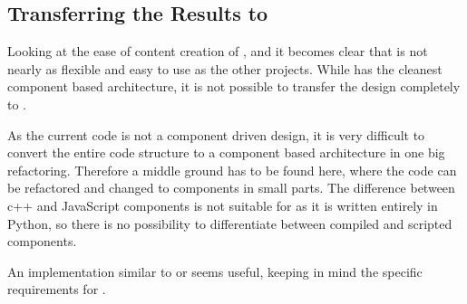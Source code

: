 \subsection{Transferring the Results to \UH{}}
Looking at the ease of content creation of \BOW{}, \GLEST{} and \AD{} it becomes clear that \UH{} is not nearly as
flexible and easy to use as the other projects. While \AD{} has the cleanest component based architecture, it is not
possible to transfer the design completely to \UH{}. 

As the current code is not a component driven design, it is very difficult to convert the entire code structure to a
component based architecture in one big refactoring. Therefore a middle ground has to be found here, where the code can
be refactored and changed to components in small parts. The difference between c++ and JavaScript components is not suitable
for \UH{} as it is written entirely in Python, so there is no possibility to differentiate between compiled and scripted
components.

An implementation similar to \BOW{} or \GLEST{} seems useful, keeping in mind the specific requirements for \UH{}.

